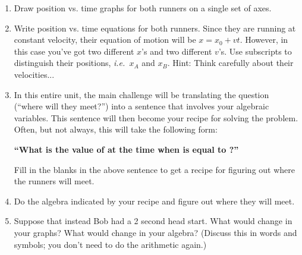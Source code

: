 \documentclass[12pt]{article}
\newcommand{\ie}{{\em i.e.\ }}
\begin{document}
\begin{enumerate}

\item Draw position vs. time graphs for both runners on a single set of axes.

\begin{center}




\end{center}

\item Write position vs. time equations for both runners. Since they are running at constant velocity, their equation of motion will be $x=x_0 + vt$. However, in this case you've got two different $x$'s and two different $v$'s. Use subscripts to distinguish their positions, \ie $x_A$ and $x_B$. Hint: Think carefully about their velocities...

\vspace{1.5in}

\item In this entire unit, the main challenge will be translating the question (``where will they meet?'') into a sentence that involves your algebraic variables. This sentence will then become your recipe for solving the problem.
Often, but not always, this will take the following form: 

\begin{center}
{\bf ``What is the value of \underline{\hspace{0.7in}} at the time when \underline{\hspace{0.7in}} is equal to \underline{\hspace{0.7in}}?''} 
\end{center}

Fill in the blanks in the above sentence to get a recipe for figuring out where the runners will meet.

\item Do the algebra indicated by your recipe and figure out where they will meet.

\vspace{2in}

\item Suppose that instead Bob had a 2 second head start. What would change in your graphs? What would change in your algebra? (Discuss this in words and symbols; you don't need to do the arithmetic again.)
\end{enumerate}
\end{document}
